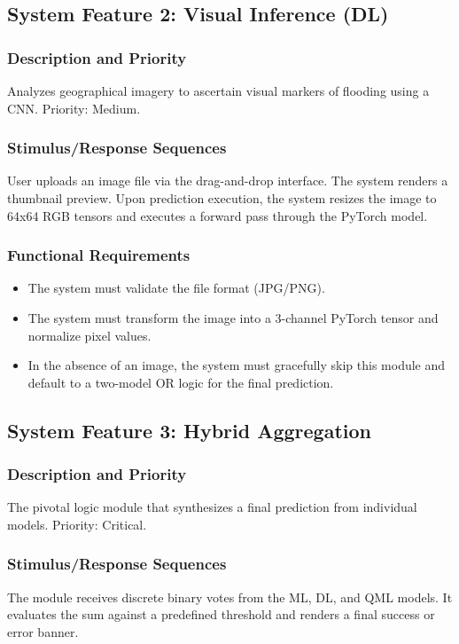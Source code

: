 \documentclass[conference]{IEEEtran}
\begin{document}
\subsection{System Feature 2: Visual Inference (DL)}
\subsubsection{Description and Priority}
Analyzes geographical imagery to ascertain visual markers of flooding using a CNN. Priority: Medium.
\subsubsection{Stimulus/Response Sequences}
User uploads an image file via the drag-and-drop interface. The system renders a thumbnail preview. Upon prediction execution, the system resizes the image to 64x64 RGB tensors and executes a forward pass through the PyTorch model.
\subsubsection{Functional Requirements}
\begin{itemize}
    \item The system must validate the file format (JPG/PNG).
    \item The system must transform the image into a 3-channel PyTorch tensor and normalize pixel values.
    \item In the absence of an image, the system must gracefully skip this module and default to a two-model OR logic for the final prediction.
\end{itemize}

\subsection{System Feature 3: Hybrid Aggregation}
\subsubsection{Description and Priority}
The pivotal logic module that synthesizes a final prediction from individual models. Priority: Critical.
\subsubsection{Stimulus/Response Sequences}
The module receives discrete binary votes from the ML, DL, and QML models. It evaluates the sum against a predefined threshold and renders a final success or error banner.
\end{document}
